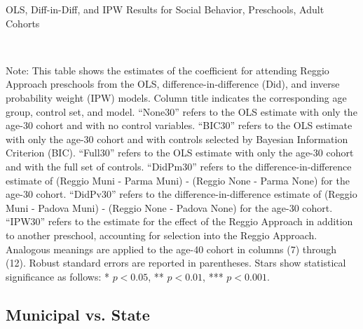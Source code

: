 \begin{landscape}
\begin{table}[H] \caption{OLS, Diff-in-Diff, and IPW Results for Social Behavior, Preschools, Adult Cohorts} \label{ols-S-reg}
\scalebox{0.80}{
}
\vspace{1ex} \\
\footnotesize\raggedright{Note: This table shows the estimates of the coefficient for attending Reggio Approach preschools from the OLS, difference-in-difference (Did), and inverse probability weight (IPW) models. Column title indicates the corresponding age group, control set, and model. ``None30'' refers to the OLS estimate with only the age-30 cohort and with no control variables. ``BIC30'' refers to the OLS estimate with only the age-30 cohort and with controls selected by Bayesian Information Criterion (BIC). ``Full30'' refers to the OLS estimate with only the age-30 cohort and with the full set of controls. ``DidPm30'' refers to the difference-in-difference estimate of (Reggio Muni - Parma Muni) - (Reggio None - Parma None) for the age-30 cohort. ``DidPv30'' refers to the difference-in-difference estimate of (Reggio Muni - Padova Muni) - (Reggio None - Padova None) for the age-30 cohort. ``IPW30'' refers to the estimate for the effect of the Reggio Approach in addition to another preschool, accounting for selection into the Reggio Approach. Analogous meanings are applied to the age-40 cohort in columns (7) through (12). Robust standard errors are reported in parentheses. Stars show statistical significance as follows: * $p < 0.05$, ** $p < 0.01$, *** $p < 0.001$.}
\end{table}









\subsection{Municipal vs. State}\label{appendix:state}

\end{landscape}
